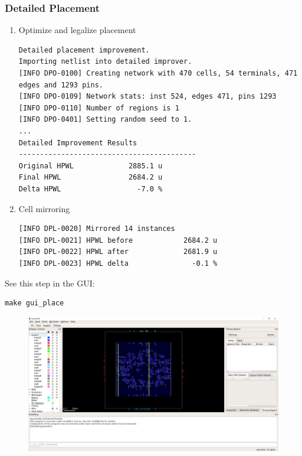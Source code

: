 \documentclass[a4paper,12pt,twoside]{article}
\begin{document}
\subsubsection{Detailed Placement}
\begin{enumerate}
    \item Optimize and legalize placement
    \begin{verbatim}
Detailed placement improvement.
Importing netlist into detailed improver.
[INFO DPO-0100] Creating network with 470 cells, 54 terminals, 471 edges and 1293 pins.
[INFO DPO-0109] Network stats: inst 524, edges 471, pins 1293
[INFO DPO-0110] Number of regions is 1
[INFO DPO-0401] Setting random seed to 1.
...
Detailed Improvement Results
------------------------------------------
Original HPWL             2885.1 u
Final HPWL                2684.2 u
Delta HPWL                  -7.0 %
    \end{verbatim}
    \item Cell mirroring
    \begin{verbatim}
[INFO DPL-0020] Mirrored 14 instances
[INFO DPL-0021] HPWL before            2684.2 u
[INFO DPL-0022] HPWL after             2681.9 u
[INFO DPL-0023] HPWL delta               -0.1 %
    \end{verbatim}
\end{enumerate}
See this step in the GUI:
\begin{verbatim}
make gui_place
\end{verbatim}
\begin{figure}[H]
    \centering
    \includegraphics[width=\textwidth]{images/2.png}
\end{figure}
\end{document}
